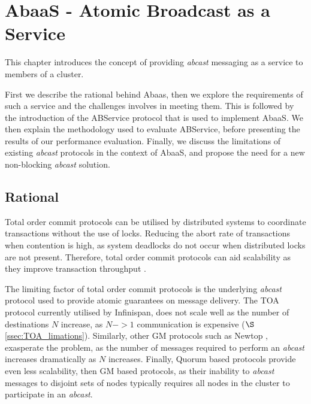 \chapter{AbaaS - Atomic Broadcast as a Service}

\ifpdf
    \graphicspath{{Chapter3/Figs/Raster/}{Chapter3/Figs/PDF/}{Chapter3/Figs/}}
\else
    \graphicspath{{Chapter3/Figs/Vector/}{Chapter3/Figs/}}
\fi


This chapter introduces the concept of providing \emph{abcast} messaging as a service to members of a cluster.

First we describe the rational behind \textsf{Abaas}, then we explore the requirements of such a service and the challenges involves in meeting them.  This is followed by the introduction of the \textsf{ABService} protocol that is used to implement \textsf{AbaaS}.  We then explain the methodology used to evaluate \textsf{ABService}, before presenting the results of our performance evaluation.  Finally, we discuss the limitations of existing \emph{abcast} protocols in the context of \textsf{AbaaS}, and propose the need for a new non-blocking \emph{abcast} solution.  

\section{Rational}
Total order commit protocols can be utilised by distributed systems to coordinate transactions without the use of locks.  Reducing the abort rate of transactions when contention is high, as system deadlocks do not occur when distributed locks are not present.  Therefore, total order commit protocols can aid scalability as they improve transaction throughput \citep{Ruivo:2011:ETO:2120967.2121604}.  

The limiting factor of total order commit protocols is the underlying \emph{abcast} protocol used to provide atomic guarantees on message delivery.  The TOA protocol currently utilised by Infinispan, does not scale well as the number of destinations $N$ increase, as $N->1$ communication is expensive ($\S$ \ref{ssec:TOA_limations}).  Similarly, other GM protocols such as Newtop \citep{Ezhilchelvan:1995:NFG:876885.880005}, exasperate the problem, as the number of messages required to perform an \emph{abcast} increases dramatically as $N$ increases.  Finally, Quorum based protocols provide even less scalability, then GM based protocols, as their inability to \emph{abcast} messages to disjoint sets of nodes typically requires all nodes in the cluster to participate in an \emph{abcast}.  

